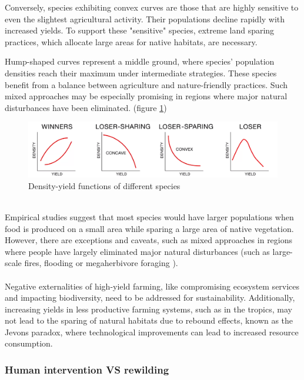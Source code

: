 \documentclass[../summary.tex]{subfiles}
\begin{document}
Conversely, species exhibiting convex curves are those that are highly sensitive to even the slightest agricultural activity. Their populations decline rapidly with increased yields. To support these "sensitive" species, extreme land sparing practices, which allocate large areas for native habitats, are necessary.

Hump-shaped curves represent a middle ground, where species' population densities reach their maximum under intermediate strategies. These species benefit from a balance between agriculture and nature-friendly practices. Such mixed approaches may be especially promising in regions where major natural disturbances have been eliminated. (figure \ref{fig:densityyieldspecies})

\begin{figure}[H]
	\centering
	\includegraphics[width=0.8\linewidth]{../images/density_yield_species}
	\caption{Density-yield functions of different species}
	\label{fig:densityyieldspecies}
\end{figure}

\ \\
Empirical studies suggest that most species would have larger populations when food is produced on a small area while sparing a large area of native vegetation. However, there are exceptions and caveats, such as mixed approaches in regions where people have largely eliminated major natural disturbances (such as large-scale fires, flooding or megaherbivore foraging ).\\
\\
Negative externalities of high-yield farming, like compromising ecosystem services and impacting biodiversity, need to be addressed for sustainability. Additionally, increasing yields in less productive farming systems, such as in the tropics, may not lead to the sparing of natural habitats due to rebound effects, known as the Jevons paradox, where technological improvements can lead to increased resource consumption.

\subsubsection{Human intervention VS rewilding}
\end{document}
